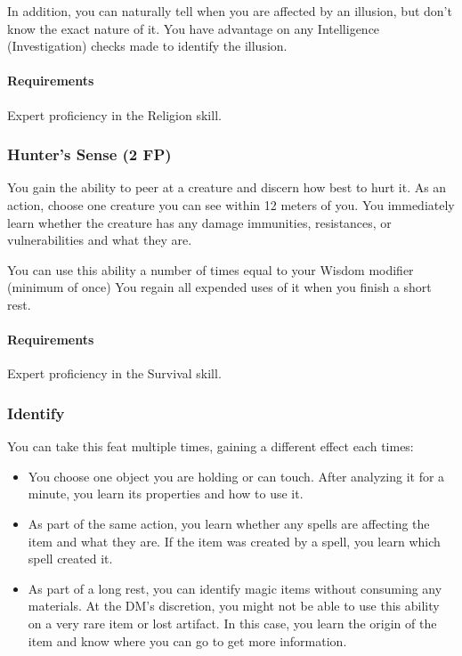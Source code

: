     In addition, you can naturally tell when you are affected by an illusion, but don't know the exact nature of it.
    You have advantage on any Intelligence (Investigation) checks made to identify the illusion.
    \paragraph{Requirements} Expert proficiency in the Religion skill.
\subsubsection{Hunter's Sense (2 FP)} \label{feat::hunterssense}
    You gain the ability to peer at a creature and discern how best to hurt it.
    As an action, choose one creature you can see within 12 meters of you.
    You immediately learn whether the creature has any damage immunities, resistances, or vulnerabilities and what they are.

    You can use this ability a number of times equal to your Wisdom modifier (minimum of once)
     You regain all expended uses of it when you finish a short rest.
    \paragraph{Requirements} Expert proficiency in the Survival skill.
\subsubsection{Identify} \label{feat::identify}
    You can take this feat multiple times, gaining a different effect each times:
    \begin{itemize}
        \item You choose one object you are holding or can touch.
        After analyzing it for a minute, you learn its properties and how to use it.
        \item As part of the same action, you learn whether any spells are affecting the item and what they are.
        If the item was created by a spell, you learn which spell created it.
        \item As part of a long rest, you can identify magic items without consuming any materials.
        At the DM's discretion, you might not be able to use this ability on a very rare item or lost artifact.
        In this case, you learn the origin of the item and know where you can go to get more information.
    \end{itemize}
